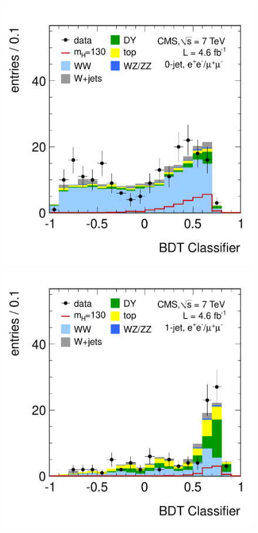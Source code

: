 \documentclass[12pt,twoside,a4paper,cmspaper,final,collab]{cms-tdr}
\begin{document}
\begin{figure}[htbp]
\begin{center}
   \includegraphics[width=\cmsFigWidth]{histo_mva_130_0j_sf}
   \includegraphics[width=\cmsFigWidth]{histo_mva_130_1j_sf}

\end{center}
\end{figure}
\end{document}
